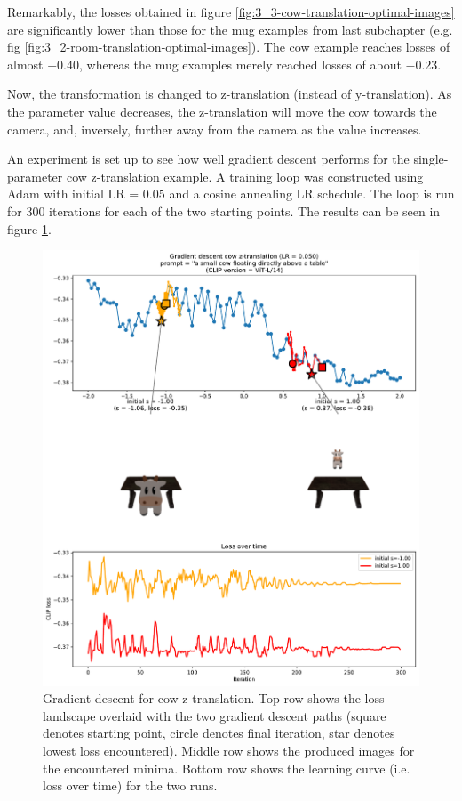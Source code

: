Remarkably, the losses obtained in figure \ref{fig:3_3-cow-translation-optimal-images} are significantly lower than those for the mug examples from last subchapter (e.g. fig \ref{fig:3_2-room-translation-optimal-images}). The cow example reaches losses of almost $-0.40$, whereas the mug examples merely reached losses of about $-0.23$.

Now, the transformation is changed to z-translation (instead of y-translation). As the parameter value decreases, the z-translation will move the cow towards the camera, and, inversely, further away from the camera as the value increases.

An experiment is set up to see how well gradient descent performs for the single-parameter cow z-translation example. A training loop was constructed using Adam with initial LR = $0.05$ and a cosine annealing LR schedule. The loop is run for 300 iterations for each of the two starting points. The results can be seen in figure \ref{figs:3_3-cow-vanilla-gd}.

\begin{figure}[H]
    \centering
    \includegraphics[width=1.0\textwidth]{figures/3_3-cow-vanilla-gd.pdf}
    \caption{Gradient descent for cow z-translation. Top row shows the loss landscape overlaid with the two gradient descent paths (square denotes starting point, circle denotes final iteration, star denotes lowest loss encountered). Middle row shows the produced images for the encountered minima. Bottom row shows the learning curve (i.e. loss over time) for the two runs.}
    \label{figs:3_3-cow-vanilla-gd}
\end{figure}

